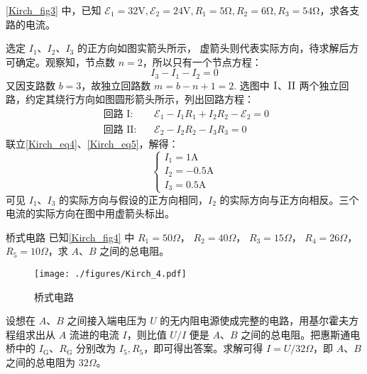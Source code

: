 \begin{example}{}
\autoref{Kirch_fig3} 中，已知 $\mathscr{E}_{1}=32 \mathrm{V}, \mathscr{E}_{2}=24 \mathrm{V}, R_{1}=5 \mathrm{\Omega}, R_{2}=6 \mathrm{\Omega}, R_{3}=54 \mathrm{\Omega}$，求各支路的电流。

选定 $I_1$、$I_2$、$I_3$ 的正方向如图实箭头所示， 虚箭头则代表实际方向，待求解后方可确定。观察知，节点数 $n =2$，所以只有一个节点方程：
\begin{equation} \label{Kirch_eq4}
I_{3}-I_{1}-I_{2}=0
\end{equation}
又因支路数 $b=3$，故独立回路数 $m = b - n + 1 =2 $. 选图中 $\rm I$、$\rm II$ 两个独立回路，约定其绕行方向如图圆形箭头所示，列出回路方程：
\begin{equation} \label{Kirch_eq5}
\begin{aligned}\text { 回路 } \mathrm{I}: && \mathscr{E}_{1} - I_{1} R_{1} + I_{2} R_{2} -\mathscr{E}_{2} = 0\\ \text { 回路 } \mathrm{II}: && \mathscr{E}_{2} - I_{2} R_{2} - I_{3} R_{3} = 0\end{aligned}
\end{equation}
联立\autoref{Kirch_eq4}、\autoref{Kirch_eq5}，解得：
\begin{equation}
\begin{cases}
I_{1}=1 \mathrm{A} \\ 
I_{2}=-0.5 \mathrm{A} \\
I_{3}=0.5 \mathrm{A}
\end{cases}
\end{equation}
可见 $I_1$、$I_3$ 的实际方向与假设的正方向相同，$I_2$ 的实际方向与正方向相反。三个电流的实际方向在图中用虚箭头标出。
\end{example}

\begin{example}{桥式电路}
已知\autoref{Kirch_fig4} 中 $R_{1}=50 \Omega$， $ R_{2}=40 \Omega$， $ R_{3}=15 \Omega$， $ R_{4}=26 \Omega$， $ R_{5}=10 \Omega$，求 $A $、$B $ 之间的总电阻。
\begin{figure}[ht]
\centering
\texttt{[image: ./figures/Kirch\_4.pdf]}
\caption{桥式电路} \label{Kirch_fig4}
\end{figure}

设想在 $A $、$B $ 之间接入端电压为 $U $ 的无内阻电源使成完整的电路，用基尔霍夫方程组求出从 $A $ 流进的电流 $I$，则比值 $U/I$ 便是 $A$、$B$ 之间的总电阻。把惠斯通电桥中的 $I_\mathrm{G}$、$R_\mathrm{G}$ 分别改为 $I_5,R_5$，即可得出答案。求解可得 $I=U/32\Omega$，即 $A$、$B$ 之间的总电阻为 $32\Omega$。
\end{example}

